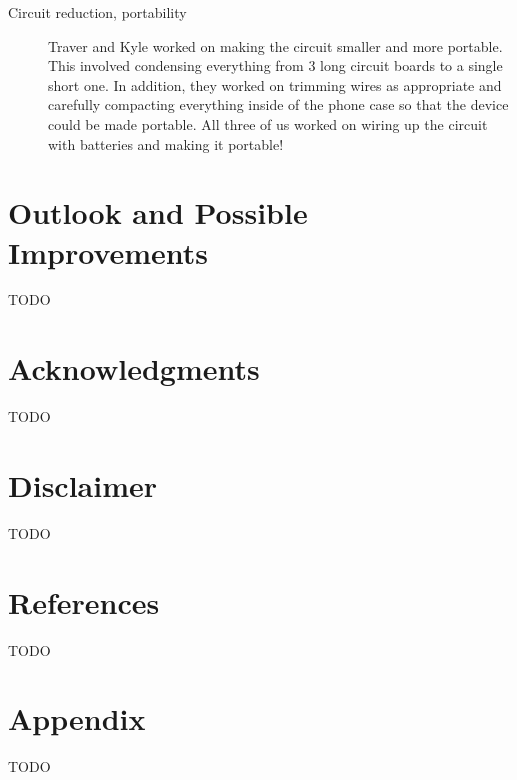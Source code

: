 \documentclass{es50report}
\begin{document}
\begin{description}
            \item[Circuit reduction, portability]
                Traver and Kyle worked on making the circuit smaller and more portable. This involved condensing everything from 3 long circuit boards to a single short one. In addition, they worked on trimming wires as appropriate and carefully compacting everything inside of the phone case so that the device could be made portable. All three of us worked on wiring up the circuit with batteries and making it portable!
        \end{description}

    \section{Outlook and Possible Improvements}
    TODO

    \section{Acknowledgments}
    TODO

    \section{Disclaimer}
    TODO

    \section{References}
    TODO

    \appendix
    \section{Appendix}
    TODO
\end{document}
